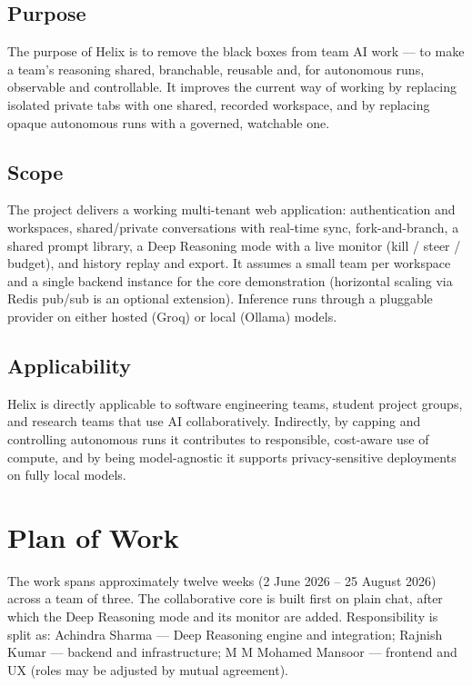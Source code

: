 \documentclass[12pt,a4paper]{report}
\begin{document}
\subsection{Purpose}
The purpose of Helix is to remove the black boxes from team AI work --- to make a team's reasoning shared, branchable, reusable and, for autonomous runs, observable and controllable. It improves the current way of working by replacing isolated private tabs with one shared, recorded workspace, and by replacing opaque autonomous runs with a governed, watchable one.

\subsection{Scope}
The project delivers a working multi-tenant web application: authentication and workspaces, shared/private conversations with real-time sync, fork-and-branch, a shared prompt library, a Deep Reasoning mode with a live monitor (kill / steer / budget), and history replay and export. It assumes a small team per workspace and a single backend instance for the core demonstration (horizontal scaling via Redis pub/sub is an optional extension). Inference runs through a pluggable provider on either hosted (Groq) or local (Ollama) models.

\subsection{Applicability}
Helix is directly applicable to software engineering teams, student project groups, and research teams that use AI collaboratively. Indirectly, by capping and controlling autonomous runs it contributes to responsible, cost-aware use of compute, and by being model-agnostic it supports privacy-sensitive deployments on fully local models.

\section{Plan of Work}
The work spans approximately twelve weeks (2 June 2026 -- 25 August 2026) across a team of three. The collaborative core is built first on plain chat, after which the Deep Reasoning mode and its monitor are added. Responsibility is split as: Achindra Sharma --- Deep Reasoning engine and integration; Rajnish Kumar --- backend and infrastructure; M M Mohamed Mansoor --- frontend and UX (roles may be adjusted by mutual agreement).
\end{document}
